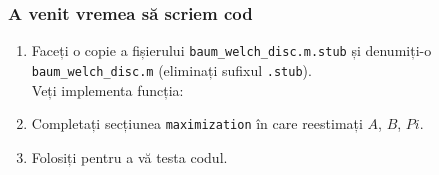 \begin{frame}
  \frametitle{A venit vremea să scriem cod}
  \begin{enumerate}
  \item Faceți o copie a fișierului \texttt{baum\_welch\_disc.m.stub} 
    și denumiți-o \texttt{baum\_welch\_disc.m} (eliminați sufixul \texttt{.stub}).
    \\Veți implementa funcția:\\
    \pause
  \item Completați secțiunea \texttt{maximization} în care reestimați $A$, $B$, $Pi$.%
    \vspace*{-1em}
    
\item Folosiți  pentru a vă testa codul.
\end{enumerate}
\end{frame}
